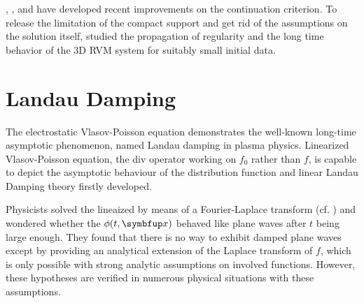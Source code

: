 {%
\cite{2016ArRMA.219..445L}, \cite{KUNZE20154413}, \cite{pallard2015criterion}
and \cite{PATEL20181841} have developed recent improvements on the continuation criterion. To release the limitation of the compact support and get rid of the assumptions on the solution itself, \cite{wang_propagation_2018} studied the propagation of regularity and the long time behavior of the 3D RVM system for suitably small initial data.


\section{Landau Damping}
\label{subsec:asymptotic}

The electrostatic Vlasov-Poisson equation \eqvp demonstrates the well-known long-time asymptotic phenomenon, named Landau damping in plasma physics. Linearized Vlasov-Poisson equation, the div operator working on $f_0$ rather than $f$, is capable to depict the asymptotic behaviour of the distribution function and linear Landau Damping theory firstly developed.


Physicists solved the lineaized \eqvp by means of a Fourier-Laplace transform (cf. \cite{krall_principles_plasma_1973}) and wondered whether the $\phi(t,\vx)$ behaved like plane waves after $t$ being large enough. They found that there is no way to exhibit damped plane waves except by providing an analytical extension of the Laplace transform of $f$, which is only possible with strong analytic assumptions on involved functions. However, these hypotheses are verified in numerous physical situations with these assumptions.

}
